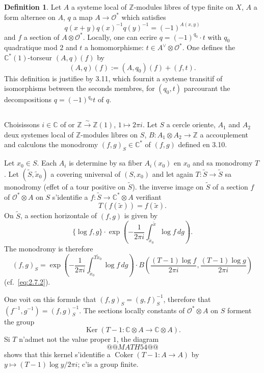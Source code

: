 \documentclass[12pt,a4paper]{article}
\theoremstyle{plain}
\theoremstyle{definition}
\newtheorem{definition}[theorem]{Definition}
\theoremstyle{remark}
\DeclareMathOperator{\Ker}{Ker}
\DeclareMathOperator{\Coker}{Coker}
\newcommand{\cO}{\mathcal{O}}
\newcommand{\Z}{\mathbb{Z}}
\newcommand{\C}{\mathbb{C}}
\providecommand{\cO}{\mathcal{O}}
\providecommand{\Ker}{\operatorname{Ker}}
\providecommand{\Coker}{\operatorname{Coker}}
\begin{document}
\begin{definition}
Let $A$ a systeme local of $\Z$-modules libres of type finite on $X$,
$A$ a form alternee on $A$, $q$ a map $A \to \cO^*$ which satisfies
\[
q(x+y)q(x)^{-1}q(y)^{-1} = (-1)^{A(x,y)}
\]
and $f$ a section of $A \otimes \cO^*$. Locally, one can ecrire $q = (-1)^{q_0} \cdot t$ with $q_0$ quadratique mod $2$ and $t$
a homomorphisme: $t \in A^\vee \otimes \cO^*$. One defines the $\C^*(1)$-torseur $(A, q)(f)$ by
\[
(A, q)(f) := (A, q_0)(f) + (f, t).
\]
This definition is justifiee by 3.11, which fournit a systeme transitif of isomorphisms between the seconds membres, for $(q_0, t)$ parcourant the decompositions
$q = (-1)^{q_0} t$ of $q$.
\end{definition}

\subsection{}

Choisissons $i \in \C$ of or $\Z \xrightarrow{\sim} \Z(1)$, $1 \mapsto 2\pi i$. Let $S$ a cercle oriente, $A_1$
and $A_2$ deux systemes local of $\Z$-modules libres on $S$, $B : A_1 \otimes A_2 \to \Z$ a accouplement
and calculons the monodromy $(f,g)_S \in \C^*$ of $(f,g)$ defined en 3.10.

Let $x_0 \in S$. Each $A_i$ is determine by sa fiber $A_i(x_0)$ en $x_0$ and sa monodromy $T$.
Let $(\tilde{S}, \tilde{x}_0)$ a covering universal of $(S, x_0)$ and let again $T : \tilde{S} \to \tilde{S}$ sa monodromy
(effet of a tour positive on $\tilde{S}$). the inverse image on $\tilde{S}$ of a section $f$ of $\cO^* \otimes A$ on $S$ s'identifie a $f : \tilde{S} \to \C^* \otimes A$ verifiant
\[
T(f(\tilde{x})) = f(\tilde{x}).
\]
On $\tilde{S}$, a section horizontale of $(f,g)$ is given by
\[
\{\log f, g\} \cdot \exp\left(-\frac{1}{2\pi i} \int_{\tilde{x}_0}^{\tilde{x}} \log f \, dg\right).
\]
The monodromy is therefore
\begin{equation}\label{eq:3.13.1}
(f, g)_S = \exp\left(-\frac{1}{2\pi i} \int_{\tilde{x}_0}^{T\tilde{x}_0} \log f \, dg\right) \cdot B\left(\frac{(T-1)\log f}{2\pi i}, \frac{(T-1)\log g}{2\pi i}\right)
\end{equation}
(cf.~\eqref{eq:2.7.2}).

One voit on this formule that $(f,g)_S = (g,f)_S^{-1}$, therefore that $(f^{-1}, g^{-1}) = (f,g)_S^{-1}$.
The sections locally constants of $\cO^* \otimes A$ on $S$ forment the group
\[
\Ker(T - 1 : \C \otimes A \to \C \otimes A).
\]
Si $T$ n'admet not the value proper $1$, the diagram
\[
@@MATH54@@
\]
shows that this kernel s'identifie a $\Coker(T - 1 : A \to A)$ by $y \mapsto (T-1)\log y / 2\pi i$;
c'is a group finite.
\end{document}
